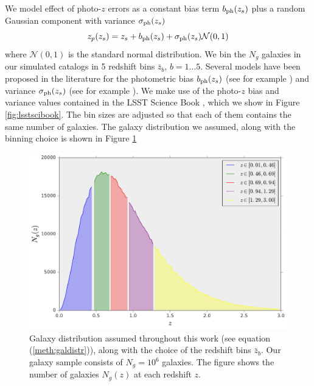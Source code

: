 \documentclass[reprint,aps,prd,superscriptaddress,showkeys,showpacs]{revtex4-1}
\begin{document}
We model effect of photo-$z$ errors as a constant bias term $b_{\rm ph}(z_s)$ plus a random Gaussian component with variance $\sigma_{\rm ph}(z_s)$
\begin{equation}
\label{meth:photoz-correction}
z_p(z_s) = z_s + b_{\rm ph}(z_s) + \sigma_{\rm ph}(z_s)\mathcal{N}(0,1)   
\end{equation}
%
where $\mathcal{N}(0,1)$ is the standard normal distribution. We bin the $N_g$ galaxies in our simulated catalogs in 5 redshift bins $\bar{z}_b$, $b=1...5$. Several models have been proposed in the literature for the photometric bias $b_{\rm ph}(z_s)$ (see for example \citep{Huterer2006}) and variance $\sigma_{\rm ph}(z_s)$ (see for example \citep{LSSTSciBook}). We make use of the photo-$z$ bias and variance values contained in the LSST Science Book \citep{LSSTSciBook}, which we show in Figure \ref{fig:lsstscibook}. The bin sizes are adjusted so that each of them contains the same number of galaxies. The galaxy distribution we assumed, along with the binning choice is shown in Figure \ref{fig:galdistr}

\begin{figure}
\includegraphics[scale=0.3]{Figures/galdistr.pdf}
\caption{Galaxy distribution assumed throughout this work (see equation (\ref{meth:galdistr})), along with the choice of the redshift bins $\bar{z}_b$. Our galaxy sample consists of $N_g=10^6$ galaxies. The figure shows the number of galaxies $N_g(z)$ at each redshift $z$.}
\label{fig:galdistr}
\end{figure}
\end{document}
